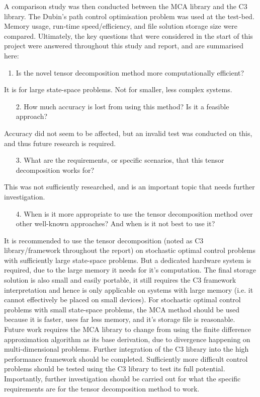 \documentclass[11pt,draftd]{article}
\begin{document}
A comparison study was then conducted between the MCA library and the C3 library. The Dubin's path control optimisation problem was used at the test-bed. Memory usage, run-time speed/efficiency, and file solution storage size were compared. Ultimately, the key questions that were considered in the start of this project were answered throughout this study and report, and are summarised here:
\begin{enumerate}
	\item Is the novel tensor decomposition method more computationally efficient?
\end{enumerate}	
It is for large state-space problems. Not for smaller, less complex systems.
\begin{enumerate}
	\item[2.] How much accuracy is lost from using this method? Is it a feasible approach?
\end{enumerate}		
Accuracy did not seem to be affected, but an invalid test was conducted on this, and thus future research is required.
\begin{enumerate}
	\item[3.] What are the requirements, or specific scenarios, that this tensor decomposition works for?
\end{enumerate}
This was not sufficiently researched, and is an important topic that needs further investigation.
\begin{enumerate}
	\item[4.] When is it more appropriate to use the tensor decomposition method over other well-known approaches? And when is it not best to use it?
\end{enumerate}
It is recommended to use the tensor decomposition (noted as C3 library/framework throughout the report) on stochastic optimal control problems with sufficiently large state-space problems. But a dedicated hardware system is required, due to the large memory it needs for it's computation. The final storage solution is also small and easily portable, it still requires the C3 framework interpretation and hence is only applicable on systems with large memory (i.e. it cannot effectively be placed on small devices). For stochastic optimal control problems with small state-space problems, the MCA method should be used because it is faster, uses far less memory, and it's storage file is reasonable. \\

Future work requires the MCA library to change from using the finite difference approximation algorithm as its base derivation, due to divergence happening on multi-dimensional problems. Further integration of the C3 library into the high performance framework should be completed. Sufficiently more difficult control problems should be tested using the C3 library to test its full potential. Importantly, further investigation should be carried out for what the specific requirements are for the tensor decomposition method to work.
\newpage
\end{document}
